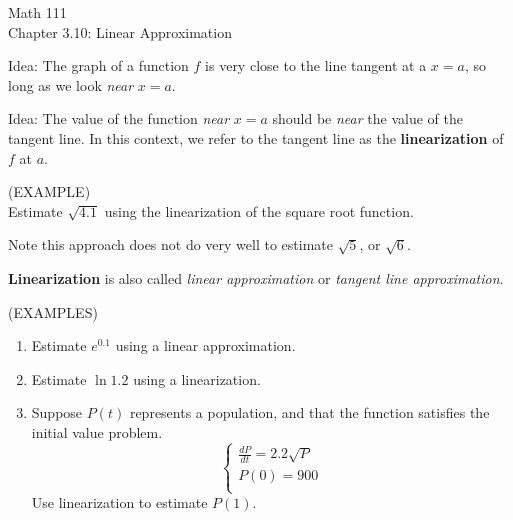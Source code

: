 \documentclass[11pt]{article}
\begin{document}
\begin{center}
\Large
\rm{Math 111}
\\
\rm{Chapter 3.10:  Linear Approximation}
\\
\end{center}
\vspace{0.2in}

Idea:  The graph of a function $f$ is very close to the line tangent at a $x=a$, so long as we look \emph{near } $x=a$.

\vspace{0.1in}

Idea:  The value of the function \emph{near} $x=a$ should be \emph{near} the value of the tangent line.  In this context, we refer to
the tangent line as the {\bf linearization } of $f$ at $a$.


\vspace{3.5in}

(EXAMPLE)\\

Estimate $\sqrt{4.1}$ using the linearization of the square root function.


\vspace{3in}

Note this approach does not do very well to estimate $\sqrt{5}$, or $\sqrt{6}$.



\pagebreak

{\bf Linearization} is also called \emph{linear approximation} or \emph{tangent line approximation}.

\vspace{.15in}

(EXAMPLES)

\begin{enumerate}
  
\item{Estimate $e^{0.1}$ using a linear approximation.}

\vspace{3in}



\item{Estimate $\ln{1.2}$ using a linearization.}

\vspace{2in}



\item{Suppose $P(t)$ represents a population, and that the function satisfies the initial value problem.
\begin{displaymath}
  \left\{ \begin{array}{ll}
\frac{dP}{dt} = 2.2\sqrt{P} \\
P(0) = 900 \\
\end{array} \right.
\end{displaymath}
Use linearization to estimate $P(1)$.
}
  \end{enumerate}
\pagebreak
\end{document}
